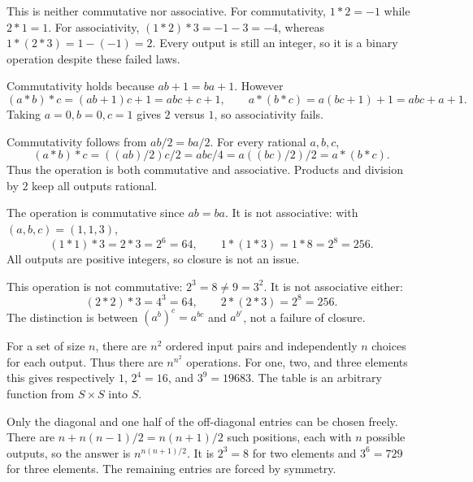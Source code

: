 
This is neither commutative nor associative. For commutativity, $1*2=-1$ while $2*1=1$. For associativity, $(1*2)*3=-1-3=-4$, whereas $1*(2*3)=1-(-1)=2$. Every output is still an integer, so it is a binary operation despite these failed laws.


Commutativity holds because $ab+1=ba+1$. However
\[(a*b)*c=(ab+1)c+1=abc+c+1,\qquad a*(b*c)=a(bc+1)+1=abc+a+1.
\]
Taking $a=0,b=0,c=1$ gives $2$ versus $1$, so associativity fails.


Commutativity follows from $ab/2=ba/2$. For every rational $a,b,c$,
\[(a*b)*c=((ab)/2)c/2=abc/4=a((bc)/2)/2=a*(b*c).
\]
Thus the operation is both commutative and associative. Products and division by $2$ keep all outputs rational.


The operation is commutative since $ab=ba$. It is not associative: with $(a,b,c)=(1,1,3)$,
\[(1*1)*3=2*3=2^6=64,\qquad1*(1*3)=1*8=2^8=256.
\]
All outputs are positive integers, so closure is not an issue.


This operation is not commutative: $2^3=8\ne9=3^2$. It is not associative either:
\[(2*2)*3=4^3=64,\qquad2*(2*3)=2^8=256.
\]
The distinction is between $(a^b)^c=a^{bc}$ and $a^{b^c}$, not a failure of closure.


For a set of size $n$, there are $n^2$ ordered input pairs and independently $n$ choices for each output. Thus there are $n^{n^2}$ operations. For one, two, and three elements this gives respectively $1$, $2^4=16$, and $3^9=19683$. The table is an arbitrary function from $S\times S$ into $S$.


Only the diagonal and one half of the off-diagonal entries can be chosen freely. There are $n+n(n-1)/2=n(n+1)/2$ such positions, each with $n$ possible outputs, so the answer is $n^{n(n+1)/2}$. It is $2^3=8$ for two elements and $3^6=729$ for three elements. The remaining entries are forced by symmetry.


